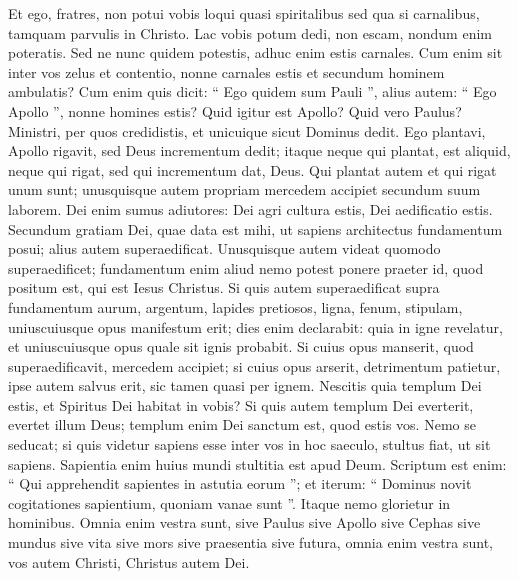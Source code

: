 \begin{biblechapter}
\begin{biblechapter}
\begin{biblechapter}
\verse Et ego, fratres, non potui vobis loqui quasi spiritalibus sed qua si carnalibus, tamquam parvulis in Christo. 
\verse Lac vobis potum dedi, non escam, nondum enim poteratis. Sed ne nunc quidem potestis, 
\verse adhuc enim estis carnales. Cum enim sit inter vos zelus et contentio, nonne carnales estis et secundum hominem ambulatis?
 \verse Cum enim quis dicit: “ Ego quidem sum Pauli ”, alius autem: “ Ego Apollo ”, nonne homines estis? 
\verse Quid igitur est Apollo? Quid vero Paulus? Ministri, per quos credidistis, et unicuique sicut Dominus dedit. 
\verse Ego plantavi, Apollo rigavit, sed Deus incrementum dedit; 
\verse itaque neque qui plantat, est aliquid, neque qui rigat, sed qui incrementum dat, Deus. 
\verse Qui plantat autem et qui rigat unum sunt; unusquisque autem propriam mercedem accipiet secundum suum laborem. 
\verse Dei enim sumus adiutores: Dei agri cultura estis, Dei aedificatio estis. 
\verse Secundum gratiam Dei, quae data est mihi, ut sapiens architectus fundamentum posui; alius autem superaedificat. Unusquisque autem videat quomodo superaedificet; 
\verse fundamentum enim aliud nemo potest ponere praeter id, quod positum est, qui est Iesus Christus. 
\verse Si quis autem superaedificat supra fundamentum aurum, argentum, lapides pretiosos, ligna, fenum, stipulam, 
\verse uniuscuiusque opus manifestum erit; dies enim declarabit: quia in igne revelatur, et uniuscuiusque opus quale sit ignis probabit. 
\verse Si cuius opus manserit, quod superaedificavit, mercedem accipiet; 
\verse si cuius opus arserit, detrimentum patietur, ipse autem salvus erit, sic tamen quasi per ignem. 
\verse Nescitis quia templum Dei estis, et Spiritus Dei habitat in vobis? 
\verse Si quis autem templum Dei everterit, evertet illum Deus; templum enim Dei sanctum est, quod estis vos.
 \verse Nemo se seducat; si quis videtur sapiens esse inter vos in hoc saeculo, stultus fiat, ut sit sapiens. 
\verse Sapientia enim huius mundi stultitia est apud Deum. Scriptum est enim:
 “ Qui apprehendit sapientes in astutia eorum ”;
 \verse et iterum:
 “ Dominus novit cogitationes sapientium,
 quoniam vanae sunt ”.
 \verse Itaque nemo glorietur in hominibus. Omnia enim vestra sunt, 
\verse sive Paulus sive Apollo sive Cephas sive mundus sive vita sive mors sive praesentia sive futura, omnia enim vestra sunt, 
\verse vos autem Christi, Christus autem Dei.
 

\end{biblechapter}
\end{biblechapter}
\end{biblechapter}
